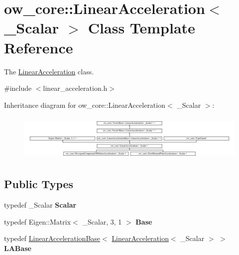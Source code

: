 \hypertarget{classow__core_1_1LinearAcceleration}{}\section{ow\+\_\+core\+:\+:Linear\+Acceleration$<$ \+\_\+\+Scalar $>$ Class Template Reference}
\label{classow__core_1_1LinearAcceleration}


The \hyperlink{classow__core_1_1LinearAcceleration}{Linear\+Acceleration} class.  




{\ttfamily \#include $<$linear\+\_\+acceleration.\+h$>$}

Inheritance diagram for ow\+\_\+core\+:\+:Linear\+Acceleration$<$ \+\_\+\+Scalar $>$\+:\begin{figure}[H]
\begin{center}
\leavevmode
\includegraphics[height=2.270884cm]{d2/d41/classow__core_1_1LinearAcceleration}
\end{center}
\end{figure}
\subsection*{Public Types}
\begin{DoxyCompactItemize}
\item 
typedef \+\_\+\+Scalar {\bfseries Scalar}\hypertarget{classow__core_1_1LinearAcceleration_a11f5e96fae3ce2a9833d73dc64a9854c}{}\label{classow__core_1_1LinearAcceleration_a11f5e96fae3ce2a9833d73dc64a9854c}

\item 
typedef Eigen\+::\+Matrix$<$ \+\_\+\+Scalar, 3, 1 $>$ {\bfseries Base}\hypertarget{classow__core_1_1LinearAcceleration_a6f2163d71404ab0bf290fb8214ecdb30}{}\label{classow__core_1_1LinearAcceleration_a6f2163d71404ab0bf290fb8214ecdb30}

\item 
typedef \hyperlink{classow__core_1_1LinearAccelerationBase}{Linear\+Acceleration\+Base}$<$ \hyperlink{classow__core_1_1LinearAcceleration}{Linear\+Acceleration}$<$ \+\_\+\+Scalar $>$ $>$ {\bfseries L\+A\+Base}\hypertarget{classow__core_1_1LinearAcceleration_ac0ff37179aa6d8853c98f4e5918f9527}{}\label{classow__core_1_1LinearAcceleration_ac0ff37179aa6d8853c98f4e5918f9527}

\end{DoxyCompactItemize}

